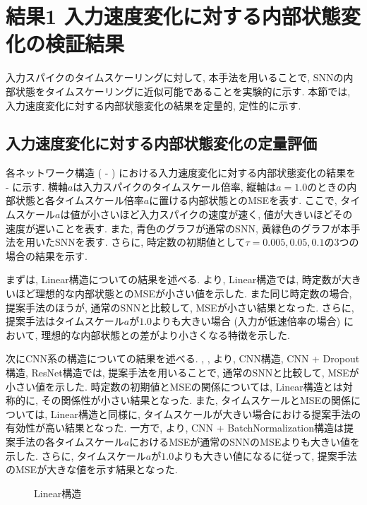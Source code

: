 \section{結果1 入力速度変化に対する内部状態変化の検証結果} \label{sec:result1}
入力スパイクのタイムスケーリングに対して, 本手法を用いることで, SNNの内部状態をタイムスケーリングに近似可能であることを実験的に示す.
本節では, 入力速度変化に対する内部状態変化の結果を定量的, 定性的に示す.

\subsection{入力速度変化に対する内部状態変化の定量評価}
各ネットワーク構造 ( - ) における入力速度変化に対する内部状態変化の結果を -  に示す.
横軸$a$は入力スパイクのタイムスケール倍率, 縦軸は$a=1.0$のときの内部状態と各タイムスケール倍率$a$に置ける内部状態とのMSEを表す.
ここで, タイムスケール$a$は値が小さいほど入力スパイクの速度が速く, 値が大きいほどその速度が遅いことを表す.
また, 青色のグラフが通常のSNN, 黄緑色のグラフが本手法を用いたSNNを表す.
さらに, 時定数の初期値として$\tau=0.005, 0.05, 0.1$の3つの場合の結果を示す.

まずは, Linear構造についての結果を述べる.
より, Linear構造では, 時定数が大きいほど理想的な内部状態とのMSEが小さい値を示した.
また同じ時定数の場合, 提案手法のほうが, 通常のSNNと比較して, MSEが小さい結果となった.
さらに, 提案手法はタイムスケール$a$が$1.0$よりも大きい場合 (入力が低速倍率の場合) において, 理想的な内部状態との差がより小さくなる特徴を示した.

次にCNN系の構造についての結果を述べる.
, , より, CNN構造, CNN + Dropout構造, ResNet構造では, 提案手法を用いることで, 通常のSNNと比較して, MSEが小さい値を示した.
時定数の初期値とMSEの関係については, Linear構造とは対称的に, その関係性が小さい結果となった.
また, タイムスケールとMSEの関係については, Linear構造と同様に, タイムスケールが大きい場合における提案手法の有効性が高い結果となった.
一方で, より, CNN + BatchNormalization構造は提案手法の各タイムスケール$a$におけるMSEが通常のSNNのMSEよりも大きい値を示した.
さらに, タイムスケール$a$が$1.0$よりも大きい値になるに従って, 提案手法のMSEが大きな値を示す結果となった.
\begin{figure}[htb]
    \centering
    
    \caption{Linear構造}
    \label{fig:result1:1:linear}
\end{figure}

